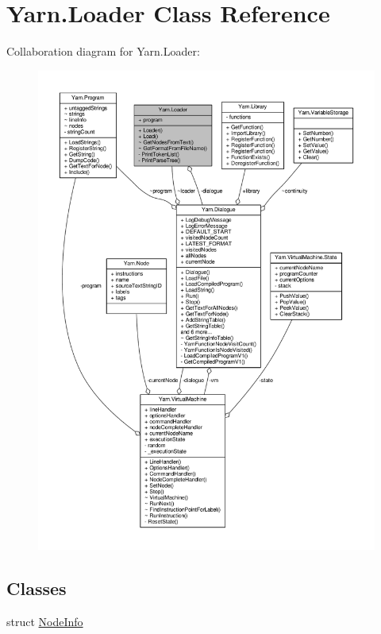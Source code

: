 \hypertarget{a00107}{\section{Yarn.\-Loader Class Reference}
\label{a00107}
}


Collaboration diagram for Yarn.\-Loader\-:
\nopagebreak
\begin{figure}[H]
\begin{center}
\leavevmode
\includegraphics[width=350pt]{d8/dc8/a00581}
\end{center}
\end{figure}
\subsection*{Classes}
\begin{DoxyCompactItemize}
\item 
struct \hyperlink{a00114}{Node\-Info}
\end{DoxyCompactItemize}
